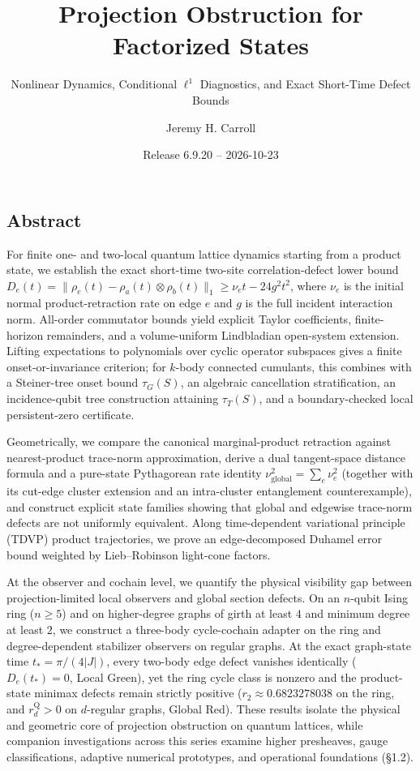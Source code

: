 \documentclass[
  11pt,
]{article}
\title{Projection Obstruction for Factorized States}
\subtitle{Nonlinear Dynamics, Conditional \(\ell^1\) Diagnostics, and Exact Short-Time Defect Bounds}
\author{Jeremy H. Carroll}
\date{Release 6.9.20 -- 2026-10-23}
\begin{document}
\maketitle

{
\hypersetup{linkcolor=}
\setcounter{tocdepth}{2}
\tableofcontents
}
\subsection{Abstract}\label{abstract}

For finite one- and two-local quantum lattice dynamics starting from a product state, we establish the exact short-time two-site correlation-defect lower bound
\(D_e(t)=\lVert\rho_e(t)-\rho_a(t)\otimes\rho_b(t)\rVert_1\geq\nu_e t-24g^2t^2\), where \(\nu_e\) is the initial normal product-retraction rate on edge \(e\) and \(g\) is the full incident interaction norm. All-order commutator bounds yield explicit Taylor coefficients, finite-horizon remainders, and a volume-uniform Lindbladian open-system extension. Lifting expectations to polynomials over cyclic operator subspaces gives a finite onset-or-invariance criterion; for \(k\)-body connected cumulants, this combines with a Steiner-tree onset bound \(\tau_G(S)\), an algebraic cancellation stratification, an incidence-qubit tree construction attaining \(\tau_T(S)\), and a boundary-checked local persistent-zero certificate.

Geometrically, we compare the canonical marginal-product retraction against nearest-product trace-norm approximation, derive a dual tangent-space distance formula and a pure-state Pythagorean rate identity \(\nu_{\mathrm{global}}^2=\sum_e\nu_e^2\) (together with its cut-edge cluster extension and an intra-cluster entanglement counterexample), and construct explicit state families showing that global and edgewise trace-norm defects are not uniformly equivalent. Along time-dependent variational principle (TDVP) product trajectories, we prove an edge-decomposed Duhamel error bound weighted by Lieb--Robinson light-cone factors.

At the observer and cochain level, we quantify the physical visibility gap between projection-limited local observers and global section defects. On an \(n\)-qubit Ising ring (\(n\ge 5\)) and on higher-degree graphs of girth at least \(4\) and minimum degree at least \(2\), we construct a three-body cycle-cochain adapter on the ring and degree-dependent stabilizer observers on regular graphs. At the exact graph-state time \(t_*=\pi/(4|J|)\), every two-body edge defect vanishes identically (\(D_e(t_*)=0\), Local Green), yet the ring cycle class is nonzero and the product-state minimax defects remain strictly positive (\(r_2\approx0.6823278038\) on the ring, and \(r_d^{\mathrm{Q}} > 0\) on \(d\)-regular graphs, Global Red). These results isolate the physical and geometric core of projection obstruction on quantum lattices, while companion investigations across this series examine higher presheaves, gauge classifications, adaptive numerical prototypes, and operational foundations (§1.2).
\end{document}
